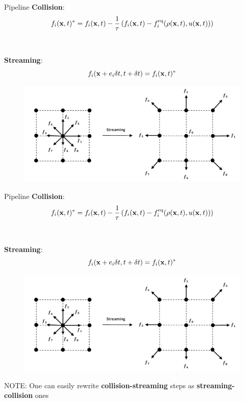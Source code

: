 \documentclass[9pt]{beamer}
\begin{document}
\begin{frame}[t]{Pipeline}
\textbf{Collision}:
\begin{equation*}
f_i({\bf x}, t)^* = f_i({\bf x}, t) - \frac{1}{\tau}\left(f_i({\bf x}, t) - f_i^\text{eq}(\rho({\bf x}, t), u({\bf x}, t))\right)
\end{equation*}
\\~\\
\textbf{Streaming}:
\begin{equation*}
f_i({\bf x} + e_i \delta t, t + \delta t) = f_i({\bf x}, t)^*
\end{equation*}

\begin{figure}
\includegraphics[scale=0.25]{images/collistion-streaming.jpg}
\centering
\end{figure}
\end{frame}

\begin{frame}[t]{Pipeline}
\textbf{Collision}:
\begin{equation*}
f_i({\bf x}, t)^* = f_i({\bf x}, t) - \frac{1}{\tau}\left(f_i({\bf x}, t) - f_i^\text{eq}(\rho({\bf x}, t), u({\bf x}, t))\right)
\end{equation*}
\\~\\
\textbf{Streaming}:
\begin{equation*}
f_i({\bf x} + e_i \delta t, t + \delta t) = f_i({\bf x}, t)^*
\end{equation*}

\begin{figure}
\includegraphics[scale=0.25]{images/collistion-streaming.jpg}
\centering
\end{figure}

\begin{block}{NOTE:}
One can easily rewrite \textbf{collision-streaming} steps as \textbf{streaming-collision} ones
\end{block}
\end{frame}
\end{document}
